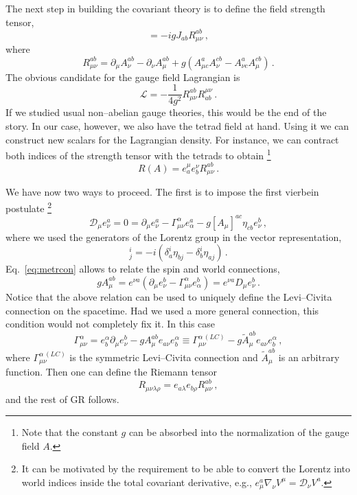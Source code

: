 \documentclass[12pt]{article}
\newcommand{\be}{\begin{equation}}
\newcommand{\ee}{\end{equation}}
\newcommand\m{\mu}
\newcommand\D{\Delta}
\newcommand\n{\nu}
\renewcommand\r{\rho}
\renewcommand\a{\alpha}
\renewcommand\l{\lambda}
\def\d{\partial}
\renewcommand{\D}{\mathcal{D}}
\begin{document}
The next step in building the covariant theory is to define the field strength tensor,
\be
[\D_\m,\D_\n]=-i g J_{ab}R^{ab}_{\m \n}\,,
\ee
where
\be
 R^{ab}_{\m \n}=\d_\mu A_\nu^{ab}-\d_\n A_\m^{ab}+g(A_{\m c}^a A^{cb}_\n
 -A_{\n c}^a A^{cb}_\m)\,.
\ee
The obvious candidate for the gauge field Lagrangian is
\be
\mathcal{L}=-\frac{1}{4 g^2}R^{ab}_{\mu \n}R^{\m \n}_{ab} \,.
\ee
If we studied usual non--abelian gauge theories, this would be the end of the story.
In our case, however, we also have the tetrad field at hand. Using it we can construct new
scalars for the Lagrangian density. For instance, we can contract both indices of
the strength tensor with the tetrads to obtain \footnote{Note that the constant $g$ can be absorbed into the normalization of the gauge field $A$.}
\be
R(A)=e^\mu_a e^\nu_b  R_{\m \n}^{ab}\,.
\ee

We have now two ways to proceed. The first is to impose the first vierbein postulate \footnote{It can be motivated by the requirement to be able to convert the Lorentz into world indices inside the total covariant derivative, e.g., $e^a_\mu\nabla_\nu V^\mu=\mathcal{D}_\nu V^a$.}
\be
\label{eq:metrcon}
\D_\m e^a_\nu=0=
\d_\mu e^a_\nu-\Gamma_{\m \n}^\a e_\a^a -g [A_{\m}]^{ac}\eta_{cb} e^b_\n \,,
\ee
where we used the generators of the Lorentz group in the vector representation,
\be
[J_{ab}^{(V)}]^i_j=-i(\delta^i_a\eta_{bj}-\delta^i_b\eta_{aj})\,.
\ee
Eq.~\eqref{eq:metrcon} allows to relate the spin and world connections,
\be
g A_{\m}^{ab}= e^{\n a}(\d_\mu e^b_\nu-\Gamma_{\m \n}^\a e^b_\a)=
e^{\n a}D_\mu e^b_\nu \,.
\ee
Notice that the above relation can be used to uniquely define the Levi--Civita connection
on the spacetime.
Had we used a more general connection,
this condition would not completely fix it.
In this case
\be
\Gamma_{\m\n}^\a=e^{\a}_b\d_\m e^b_\n-gA_\m^{ab}e_{a\nu}e^{\a}_b \equiv
\Gamma_{\m\n}^{\a\,(LC)} -g\tilde A_\m^{ab}e_{a\nu}e^{\a}_b
\,,
\ee
where $\Gamma_{\m\n}^{\a\,(LC)}$ is the symmetric Levi--Civita connection and
 $\tilde A_\m^{ab}$ is an arbitrary function.
Then one can define the Riemann tensor
\be
R_{\m \n \l \r}=e_{a\l}e_{b\r}R^{ab}_{\m \n}\,,
\ee
and the rest of GR follows.
\end{document}

